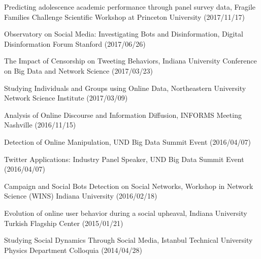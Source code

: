 \documentclass[10pt]{article}
\newenvironment{innerlist}[1][\enskip\textbullet]%
        {\begin{compactitem}[#1]}{\end{compactitem}}
\begin{document}
\begin{innerlist}
\item Predicting adolescence academic performance through panel survey data, Fragile Families Challenge Scientific Workshop at Princeton University (2017/11/17)
\item Observatory on Social Media: Investigating Bots and Disinformation, Digital Disinformation Forum Stanford (2017/06/26)
\item The Impact of Censorship on Tweeting Behaviors, Indiana University Conference on Big Data and Network Science (2017/03/23)
\item Studying Individuals and Groups using Online Data, Northeastern University Network Science Institute (2017/03/09)
\item Analysis of Online Discourse and Information Diffusion, INFORMS Meeting Nashville (2016/11/15)
\item Detection of Online Manipulation, UND Big Data Summit Event (2016/04/07)
\item Twitter Applications: Industry Panel Speaker, UND Big Data Summit Event (2016/04/07)
\item Campaign and Social Bots Detection on Social Networks, Workshop in Network Science (WINS) Indiana University (2016/02/18)
\item Evolution of online user behavior during a social upheaval, Indiana University Turkish Flagship Center (2015/01/21)
\item Studying Social Dynamics Through Social Media, Istanbul Technical University Physics Department Colloquia (2014/04/28)
\end{innerlist}
\end{document}
